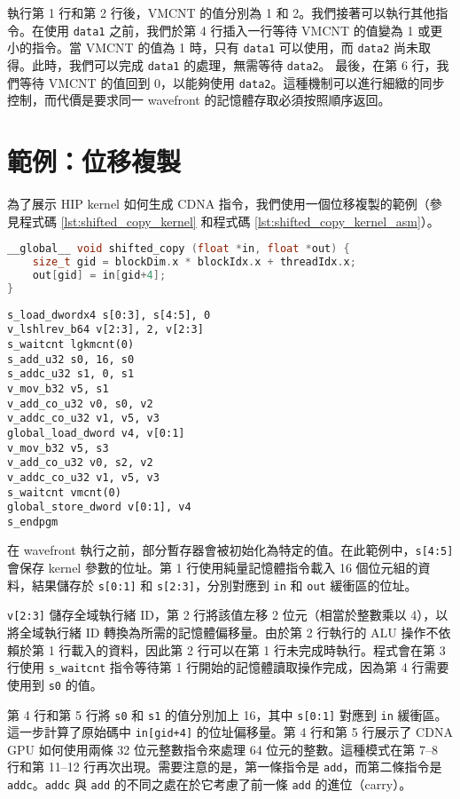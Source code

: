 執行第 1 行和第 2 行後，VMCNT 的值分別為 1 和 2。我們接著可以執行其他指令。在使用 \lstinline|data1| 之前，我們於第 4 行插入一行等待 VMCNT 的值變為 1 或更小的指令。當 VMCNT 的值為 1 時，只有 \lstinline|data1| 可以使用，而 \lstinline|data2| 尚未取得。此時，我們可以完成 \lstinline|data1| 的處理，無需等待 \lstinline|data2|。
最後，在第 6 行，我們等待 VMCNT 的值回到 0，以能夠使用 \lstinline|data2|。這種機制可以進行細緻的同步控制，而代價是要求同一 wavefront 的記憶體存取必須按照順序返回。


\section{範例：位移複製}
為了展示 HIP kernel 如何生成 CDNA 指令，我們使用一個位移複製的範例（參見程式碼 \ref{lst:shifted_copy_kernel} 和程式碼 \ref{lst:shifted_copy_kernel_asm}）。

\begin{lstlisting}[caption={位移複製的 kernel}, label={lst:shifted_copy_kernel}, language={C++}]
__global__ void shifted_copy (float *in, float *out) {
    size_t gid = blockDim.x * blockIdx.x + threadIdx.x;
    out[gid] = in[gid+4];
}
\end{lstlisting}

\begin{lstlisting}[caption={從位移複製 kernel 生成的組合語言程式碼}, label={lst:shifted_copy_kernel_asm}]
s_load_dwordx4 s[0:3], s[4:5], 0
v_lshlrev_b64 v[2:3], 2, v[2:3]
s_waitcnt lgkmcnt(0)
s_add_u32 s0, 16, s0
s_addc_u32 s1, 0, s1
v_mov_b32 v5, s1
v_add_co_u32 v0, s0, v2
v_addc_co_u32 v1, v5, v3
global_load_dword v4, v[0:1]
v_mov_b32 v5, s3
v_add_co_u32 v0, s2, v2
v_addc_co_u32 v1, v5, v3
s_waitcnt vmcnt(0)
global_store_dword v[0:1], v4
s_endpgm
\end{lstlisting}

在 wavefront 執行之前，部分暫存器會被初始化為特定的值。在此範例中，\lstinline|s[4:5]| 會保存 kernel 參數的位址。第 1 行使用純量記憶體指令載入 16 個位元組的資料，結果儲存於 \lstinline|s[0:1]| 和 \lstinline|s[2:3]|，分別對應到 \lstinline|in| 和 \lstinline|out| 緩衝區的位址。

\lstinline|v[2:3]| 儲存全域執行緒 ID，第 2 行將該值左移 2 位元（相當於整數乘以 4），以將全域執行緒 ID 轉換為所需的記憶體偏移量。由於第 2 行執行的 ALU 操作不依賴於第 1 行載入的資料，因此第 2 行可以在第 1 行未完成時執行。程式會在第 3 行使用 \lstinline|s_waitcnt| 指令等待第 1 行開始的記憶體讀取操作完成，因為第 4 行需要使用到 \lstinline|s0| 的值。

第 4 行和第 5 行將 \lstinline|s0| 和 \lstinline|s1| 的值分別加上 16，其中 \lstinline|s[0:1]| 對應到 \lstinline|in| 緩衝區。這一步計算了原始碼中 \lstinline|in[gid+4]| 的位址偏移量。第 4 行和第 5 行展示了 CDNA GPU 如何使用兩條 32 位元整數指令來處理 64 位元的整數。這種模式在第 7–8 行和第 11–12 行再次出現。需要注意的是，第一條指令是 \lstinline|add|，而第二條指令是 \lstinline|addc|。\lstinline|addc| 與 \lstinline|add| 的不同之處在於它考慮了前一條 \lstinline|add| 的進位（carry）。

